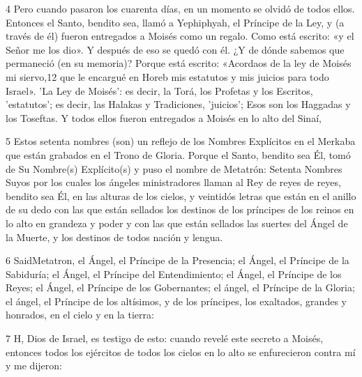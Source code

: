 \par 4 Pero cuando pasaron los cuarenta días, en un momento se olvidó de todos ellos. Entonces el Santo, bendito sea, llamó a Yephiphyah, el Príncipe de la Ley, y (a través de él) fueron entregados a Moisés como un regalo. Como está escrito: «y el Señor me los dio». Y después de eso se quedó con él. ¿Y de dónde sabemos que permaneció (en su memoria)? Porque está escrito: «Acordaos de la ley de Moisés mi siervo,12 que le encargué en Horeb mis estatutos y mis juicios para todo Israel». 'La Ley de Moisés': es decir, la Torá, los Profetas y los Escritos, 'estatutos'; es decir, las Halakas y Tradiciones, 'juicios'; Esos son los Haggadas y los Toseftas. Y todos ellos fueron entregados a Moisés en lo alto del Sinaí,

\par 5 Estos setenta nombres (son) un reflejo de los Nombres Explícitos en el Merkaba que están grabados en el Trono de Gloria. Porque el Santo, bendito sea Él, tomó de Su Nombre(s) Explícito(s) y puso el nombre de Metatrón: Setenta Nombres Suyos por los cuales los ángeles ministradores llaman al Rey de reyes de reyes, bendito sea Él, en las alturas de los cielos, y veintidós letras que están en el anillo de su dedo con las que están sellados los destinos de los príncipes de los reinos en lo alto en grandeza y poder y con las que están sellados las suertes del Ángel de la Muerte, y los destinos de todos nación y lengua.

\par 6 SaidMetatron, el Ángel, el Príncipe de la Presencia; el Ángel, el Príncipe de la Sabiduría; el Ángel, el Príncipe del Entendimiento; el Ángel, el Príncipe de los Reyes; el Ángel, el Príncipe de los Gobernantes; el ángel, el Príncipe de la Gloria; el ángel, el Príncipe de los altísimos, y de los príncipes, los exaltados, grandes y honrados, en el cielo y en la tierra:

\par 7 H, Dios de Israel, es testigo de esto: cuando revelé este secreto a Moisés, entonces todos los ejércitos de todos los cielos en lo alto se enfurecieron contra mí y me dijeron:

